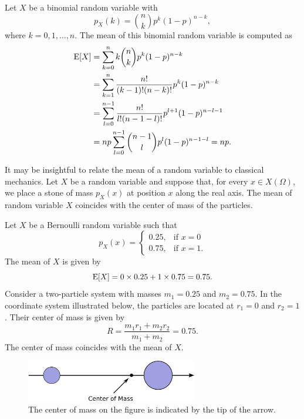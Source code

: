 \begin{example}
Let $X$ be a binomial random variable with
\begin{equation*}
p_X (k) = \binom{n}{k} p^k (1-p)^{n-k} ,
\end{equation*}
where $k = 0, 1, \ldots, n$.
The mean of this binomial random variable is computed as
\begin{equation*}
\begin{split}
\mathrm{E} [X] &= \sum_{k=0}^n k \binom{n}{k} p^k (1-p)^{n-k} \\
&= \sum_{k=1}^n \frac{n!}{(k-1)!(n-k)!} p^k (1-p)^{n-k} \\
&= \sum_{l=0}^{n-1} \frac{n!}{l!(n-1-l)!} p^{l+1} (1-p)^{n-l-1} \\
&= n p \sum_{l=0}^{n-1} \binom{n-1}{l} p^{l} (1-p)^{n-1-l}
= n p .
\end{split}
\end{equation*}
\end{example}

It may be insightful to relate the mean of a random variable to classical mechanics.
Let $X$ be a random variable and suppose that, for every $x \in X(\Omega)$, we place a stone of mass $p_X(x)$ at position $x$ along the real axis.
The mean of random variable $X$ coincides with the center of mass of the particles.

\begin{example}
Let $X$ be a Bernoulli random variable such that
\begin{equation*}
p_X (x) = \left\{ \begin{array}{ll}
0.25, & \text{if }x = 0 \\
0.75, & \text{if }x = 1.
\end{array} \right.
\end{equation*}
The mean of $X$ is given by
\begin{equation*}
\mathrm{E} [X] = 0 \times 0.25 + 1 \times 0.75 = 0.75 .
\end{equation*}
Consider a two-particle system with masses $m_1 = 0.25$ and $m_2 = 0.75$.
In the coordinate system illustrated below, the particles are located at $r_1 = 0$ and $r_2 = 1$.
Their center of mass is given by
\begin{equation*}
R = \frac{ m_1 r_1 + m_2 r_2 }{ m_1 + m_2 } = 0.75 .
\end{equation*}
The center of mass coincides with the mean of $X$.

\begin{figure}[ht]
\begin{center}
\includegraphics[height=1.8cm]{Figures/5Chapter/mass}
\end{center}
\caption{The center of mass on the figure is indicated by the tip of the arrow.}
\end{figure}
\end{example}

